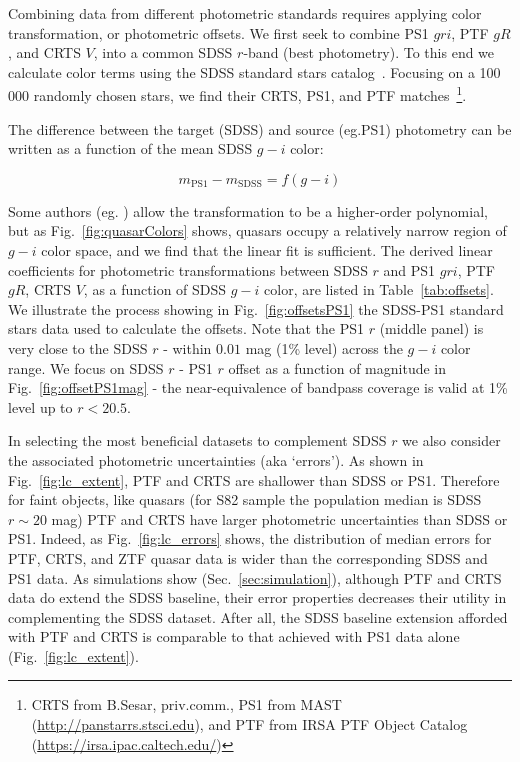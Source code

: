 \documentclass[twocolumn]{aastex62}
\begin{document}
Combining data from different photometric standards requires applying color transformation, or photometric offsets. We first seek to combine PS1 $gri$,  PTF $gR$, and CRTS $V$, into a common SDSS $r$-band (best photometry). To this end we calculate  color terms using the SDSS standard stars catalog~\citep{ivezic2007}. Focusing on a 100 000 randomly chosen stars, we find their CRTS, PS1, and PTF matches~\footnote{CRTS from B.Sesar, priv.comm., PS1 from MAST (\url{http://panstarrs.stsci.edu}), and PTF from IRSA PTF Object Catalog (\url{https://irsa.ipac.caltech.edu/})}. 

The difference  between the target (SDSS) and source (eg.PS1) photometry can be written as a function of the mean SDSS $g-i$ color: 

\begin{equation}
m_{\mathrm{PS1}} - m_{\mathrm{SDSS}} = f(g-i)
\end{equation}

Some authors (eg. \citealt{li2018}) allow the transformation to be a higher-order polynomial, but as Fig.~\ref{fig:quasarColors} shows, quasars occupy a relatively narrow region of $g-i$ color space, and we find that the linear fit is sufficient. The derived linear coefficients for photometric transformations between SDSS $r$ and PS1 $gri$, PTF $gR$, CRTS $V$,  as a function of SDSS $g-i$ color, are listed in Table~\ref{tab:offsets}. We illustrate the process showing in Fig.~\ref{fig:offsetsPS1} the SDSS-PS1 standard stars data used to calculate the offsets. Note that the PS1 $r$ (middle panel) is very close to the SDSS $r$ - within  $0.01$ mag (1\% level) across the $g-i$ color range. We focus on SDSS $r$ - PS1 $r$ offset as a function of magnitude in Fig.~\ref{fig:offsetPS1mag} - the near-equivalence of bandpass coverage is valid at 1\% level up to $r < 20.5$. %

In selecting the most beneficial datasets to complement SDSS $r$ we also consider the associated photometric uncertainties (aka `errors'). As shown in Fig.~\ref{fig:lc_extent},  PTF and CRTS are shallower than SDSS or PS1. Therefore for faint objects, like quasars (for S82 sample the population median is SDSS $r \sim 20$ mag) PTF and CRTS have larger photometric uncertainties than SDSS or PS1. Indeed, as Fig.~\ref{fig:lc_errors} shows, the distribution of median errors for PTF, CRTS, and ZTF quasar data is wider than the corresponding SDSS and PS1 data. As simulations show (Sec.~\ref{sec:simulation}), although PTF and CRTS data do extend the SDSS baseline, their error properties decreases their utility in complementing the SDSS dataset. After all, the SDSS baseline extension afforded with PTF and CRTS is comparable to that achieved with PS1 data alone (Fig.~\ref{fig:lc_extent}). 
\end{document}
